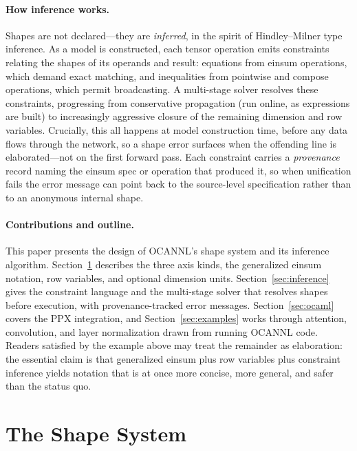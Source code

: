 \documentclass[acmsmall,nonacm,review]{acmart}
\begin{document}
\paragraph{How inference works.}
Shapes are not declared---they are \emph{inferred}, in the spirit of
Hindley--Milner type inference. As a model is constructed, each tensor
operation emits constraints relating the shapes of its operands and result:
equations from einsum operations, which demand exact matching, and
inequalities from pointwise and compose operations, which permit
broadcasting. A multi-stage solver resolves these constraints, progressing
from conservative propagation (run online, as expressions are built) to
increasingly aggressive closure of the remaining dimension and row variables.
Crucially, this all happens at model construction time, before any data flows
through the network, so a shape error surfaces when the offending line is
elaborated---not on the first forward pass. Each constraint carries a
\emph{provenance} record naming the einsum spec or operation that produced
it, so when unification fails the error message can point back to the
source-level specification rather than to an anonymous internal shape.

\paragraph{Contributions and outline.}
This paper presents the design of OCANNL's shape system and its inference
algorithm. Section~\ref{sec:shapes} describes the three axis kinds, the
generalized einsum notation, row variables, and optional dimension units.
Section~\ref{sec:inference} gives the constraint language and the multi-stage
solver that resolves shapes before execution, with provenance-tracked error
messages. Section~\ref{sec:ocaml} covers the PPX integration, and
Section~\ref{sec:examples} works through attention, convolution, and layer
normalization drawn from running OCANNL code. Readers satisfied by the
example above may treat the remainder as elaboration: the essential claim is
that generalized einsum plus row variables plus constraint inference yields
notation that is at once more concise, more general, and safer than the
status quo.

\section{The Shape System}
\label{sec:shapes}
\end{document}
